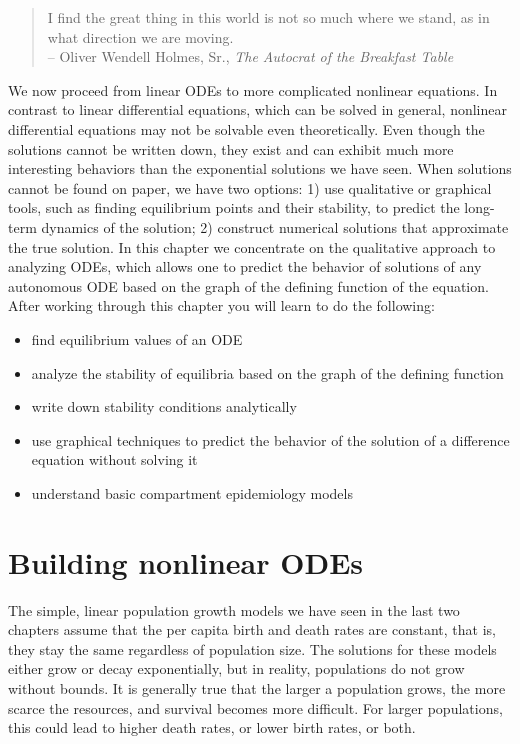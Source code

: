 \documentclass[
]{book}
\theoremstyle{definition}
\theoremstyle{definition}
\theoremstyle{definition}
\theoremstyle{remark}
\begin{document}

\begin{quote}
I find the great thing in this world is not so much where we stand, as in what direction we are moving.\\
-- Oliver Wendell Holmes, Sr., \emph{The Autocrat of the Breakfast Table}
\end{quote}

We now proceed from linear ODEs to more complicated nonlinear equations. In contrast to linear differential equations, which can be solved in general, nonlinear differential equations may not be solvable even theoretically. Even though the solutions cannot be written down, they exist and can exhibit much more interesting behaviors than the exponential solutions we have seen. When solutions cannot be found on paper, we have two options: 1) use qualitative or graphical tools, such as finding equilibrium points and their stability, to predict the long-term dynamics of the solution; 2) construct numerical solutions that approximate the true solution. In this chapter we concentrate on the qualitative approach to analyzing ODEs, which allows one to predict the behavior of solutions of any autonomous ODE based on the graph of the defining function of the equation. After working through this chapter you will learn to do the following:

\begin{itemize}
\item
  find equilibrium values of an ODE
\item
  analyze the stability of equilibria based on the graph of the defining function
\item
  write down stability conditions analytically
\item
  use graphical techniques to predict the behavior of the solution of a difference equation without solving it
\item
  understand basic compartment epidemiology models
\end{itemize}

\hypertarget{building-nonlinear-odes}{%
\section{Building nonlinear ODEs}\label{building-nonlinear-odes}}

\label{sec:model16}

The simple, linear population growth models we have seen in the last two chapters assume that the per capita birth and death rates are constant, that is, they stay the same regardless of population size. The solutions for these models either grow or decay exponentially, but in reality, populations do not grow without bounds. It is generally true that the larger a population grows, the more scarce the resources, and survival becomes more difficult. For larger populations, this could lead to higher death rates, or lower birth rates, or both.
\end{document}

